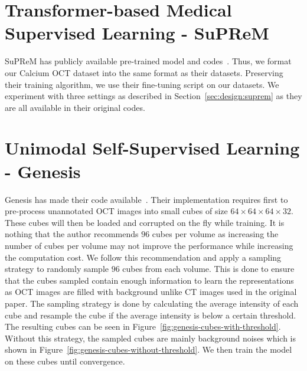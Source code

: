 \documentclass[a4paper,11pt,oneside]{report}
\begin{document}
\section{Transformer-based Medical Supervised Learning - SuPReM}
SuPReM has publicly available pre-trained model and codes~\cite{Li2024}. Thus, we format our Calcium OCT dataset into the same format as their datasets. Preserving their training algorithm, we use their fine-tuning script on our datasets. We experiment with three settings as described in Section~\ref{sec:design:suprem} as they are all available in their original codes.

\section{Unimodal Self-Supervised Learning - Genesis}
Genesis has made their code available~\cite{Zhou2021}. Their implementation requires first to pre-process unannotated OCT images into small cubes of size $64\times 64\times 64\times 32$. These cubes will then be loaded and corrupted on the fly while training. It is nothing that the author recommends $96$ cubes per volume as increasing the number of cubes per volume may not improve the performance while increasing the computation cost. We follow this recommendation and apply a sampling strategy to randomly sample $96$ cubes from each volume. This is done to ensure that the cubes sampled contain enough information to learn the representations as OCT images are filled with background unlike CT images used in the original paper. The sampling strategy is done by calculating the average intensity of each cube and resample the cube if the average intensity is below a certain threshold. The resulting cubes can be seen in Figure~\ref{fig:genesis-cubes-with-threshold}. Without this strategy, the sampled cubes are mainly background noises which is shown in Figure~\ref{fig:genesis-cubes-without-threshold}. We then train the model on these cubes until convergence.
\end{document}
